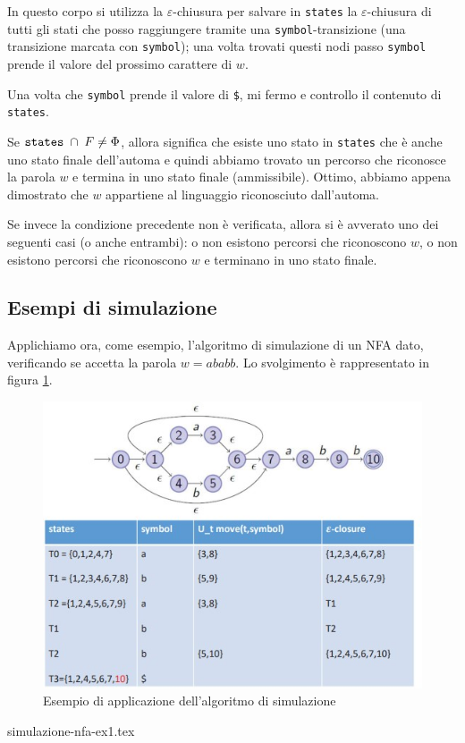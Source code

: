 \documentclass[class=book, crop=false, oneside, 12pt]{standalone}
\begin{document}
In questo corpo si utilizza la \(\varepsilon\)-chiusura per salvare in \texttt{states} la \(\varepsilon\)-chiusura di tutti gli stati che posso raggiungere tramite una \texttt{symbol}-transizione (una transizione marcata con \texttt{symbol}); una volta trovati questi nodi passo \texttt{symbol} prende il valore del prossimo carattere di \(w\).

Una volta che \texttt{symbol} prende il valore di \texttt{\$}, mi fermo e controllo il contenuto di \texttt{states}.

Se \(\textrm{\texttt{states}} \; \cap \; F \neq \Phi\), allora significa che esiste uno stato in \texttt{states} che è anche uno stato finale dell'automa e quindi abbiamo trovato un percorso che riconosce la parola \(w\) e termina in uno stato finale (ammissibile). Ottimo, abbiamo appena dimostrato che \(w\) appartiene al linguaggio riconosciuto dall'automa.

Se invece la condizione precedente non è verificata, allora si è avverato uno dei seguenti casi (o anche entrambi): o non esistono percorsi che riconoscono \(w\), o non esistono percorsi che riconoscono \(w\) e terminano in uno stato finale.

\subsection{Esempi di simulazione}
Applichiamo ora, come esempio, l'algoritmo di simulazione di un NFA dato, verificando se accetta la parola \(w  = ababb\). Lo svolgimento è rappresentato in figura \ref{simulazione_es_1}.

\begin{figure}
    \centering
    \includegraphics[width=.6\textwidth,keepaspectratio]{simulazione_es_1}
    \caption{Esempio di applicazione dell'algoritmo di simulazione}
    \label{simulazione_es_1}
\end{figure}

\begin{table}[H]
	\centering
	{simulazione-nfa-ex1.tex}
    \caption{}
    \label{simulazione-nfa-ex1}
\end{table} 
\end{document}
